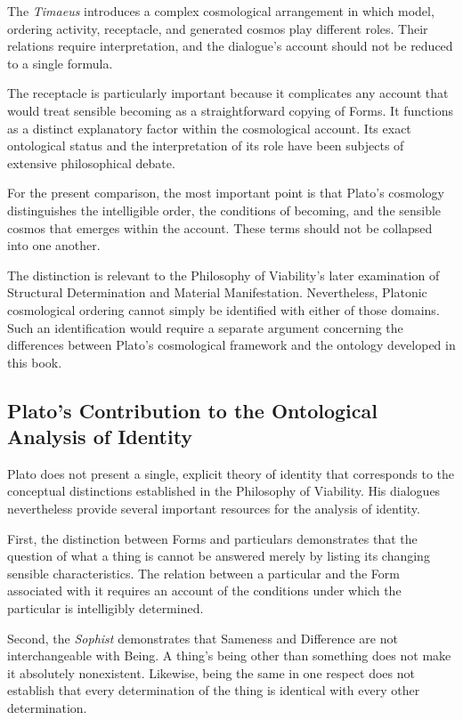 The \textit{Timaeus} introduces a complex cosmological arrangement
in which model, ordering activity, receptacle, and generated cosmos
play different roles. Their relations require interpretation, and
the dialogue's account should not be reduced to a single formula.

The receptacle is particularly important because it complicates
any account that would treat sensible becoming as a straightforward
copying of Forms. It functions as a distinct explanatory factor
within the cosmological account. Its exact ontological status and
the interpretation of its role have been subjects of extensive
philosophical debate.

For the present comparison, the most important point is that
Plato's cosmology distinguishes the intelligible order, the
conditions of becoming, and the sensible cosmos that emerges
within the account. These terms should not be collapsed into
one another.

The distinction is relevant to the Philosophy of Viability's
later examination of Structural Determination and Material
Manifestation. Nevertheless, Platonic cosmological ordering
cannot simply be identified with either of those domains. Such
an identification would require a separate argument concerning
the differences between Plato's cosmological framework and the
ontology developed in this book.

\subsection{Plato's Contribution to the Ontological Analysis of Identity}

Plato does not present a single, explicit theory of identity that
corresponds to the conceptual distinctions established in the
Philosophy of Viability. His dialogues nevertheless provide several
important resources for the analysis of identity.

First, the distinction between Forms and particulars demonstrates
that the question of what a thing is cannot be answered merely by
listing its changing sensible characteristics. The relation between
a particular and the Form associated with it requires an account
of the conditions under which the particular is intelligibly
determined.

Second, the \textit{Sophist} demonstrates that Sameness and Difference
are not interchangeable with Being. A thing's being other than
something does not make it absolutely nonexistent. Likewise,
being the same in one respect does not establish that every
determination of the thing is identical with every other
determination.

